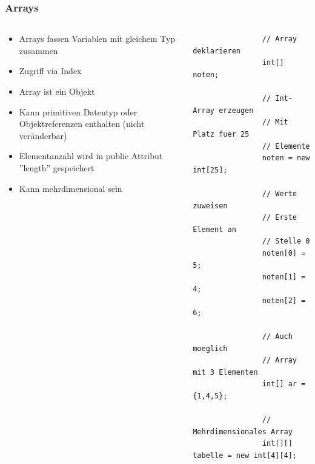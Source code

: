 \begin{frame}[fragile]
	  \frametitle{Arrays}
		 \begin{columns}
		 \begin{column}{0.5\textwidth}
			  \small
			  \begin{itemize}
			    \item Arrays fassen Variablen mit gleichem Typ
			    zusammen
			    \item Zugriff via Index
			    \item Array ist ein Objekt
			    \item Kann primitiven Datentyp 
			    oder Objektreferenzen enthalten
			    (nicht ver\"anderbar)
			    \item Elementanzahl wird in public Attribut
			    ''length'' gespeichert
			    \item Kann mehrdimensional sein
			  \end{itemize}
		 \end{column}
		 \begin{column}{0.5\textwidth}
		 	\begin{lstlisting}
		 		// Array deklarieren
		 		int[] noten;
		 		
		 		// Int-Array erzeugen
		 		// Mit Platz fuer 25
		 		// Elemente
		 		noten = new int[25];
		 		
		 		// Werte zuweisen
		 		// Erste Element an
		 		// Stelle 0
		 		noten[0] = 5;
		 		noten[1] = 4;
		 		noten[2] = 6;
		 		
		 		// Auch moeglich
		 		// Array mit 3 Elementen
		 		int[] ar = {1,4,5};
		 		
		 		// Mehrdimensionales Array
		 		int[][] tabelle = new int[4][4];
		 		
		 	\end{lstlisting}
		 \end{column}
		 \end{columns}
\end{frame}


